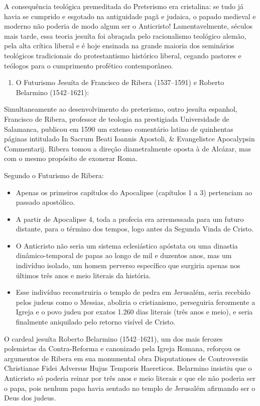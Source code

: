A consequência teológica premeditada do Preterismo era cristalina: se tudo já havia se cumprido e esgotado na antiguidade pagã e judaica, o papado medieval e moderno não poderia de modo algum ser o Anticristo! Lamentavelmente, séculos mais tarde, essa teoria jesuíta foi abraçada pelo racionalismo teológico alemão, pela alta crítica liberal e é hoje ensinada na grande maioria dos seminários teológicos tradicionais do protestantismo histórico liberal, cegando pastores e teólogos para o cumprimento profético contemporâneo.

\begin{enumerate}
  \item O Futurismo Jesuíta de Francisco de Ribera (1537–1591) e Roberto Belarmino (1542–1621):
\end{enumerate}

Simultaneamente ao desenvolvimento do preterismo, outro jesuíta espanhol, Francisco de Ribera, professor de teologia na prestigiada Universidade de Salamanca, publicou em 1590 um extenso comentário latino de quinhentas páginas intitulado In Sacrum Beati Ioannis Apostoli, \& Evangelistce Apocalypsin Commentarij. Ribera tomou a direção diametralmente oposta à de Alcázar, mas com o mesmo propósito de exonerar Roma.

Segundo o Futurismo de Ribera:
\begin{itemize}
  \item Apenas os primeiros capítulos do Apocalipse (capítulos 1 a 3) pertenciam ao passado apostólico.
  \item A partir de Apocalipse 4, toda a profecia era arremessada para um futuro distante, para o término dos tempos, logo antes da Segunda Vinda de Cristo.
  \item O Anticristo não seria um sistema eclesiástico apóstata ou uma dinastia dinâmico-temporal de papas ao longo de mil e duzentos anos, mas um indivíduo isolado, um homem perverso específico que surgiria apenas nos últimos três anos e meio literais da história.
  \item Esse indivíduo reconstruiria o templo de pedra em Jerusalém, seria recebido pelos judeus como o Messias, aboliria o cristianismo, perseguiria ferozmente a Igreja e o povo judeu por exatos 1.260 dias literais (três anos e meio), e seria finalmente aniquilado pelo retorno visível de Cristo.
\end{itemize}


O cardeal jesuíta Roberto Belarmino (1542–1621), um dos mais ferozes polemistas da Contra-Reforma e canonizado pela Igreja Romana, reforçou os argumentos de Ribera em sua monumental obra Disputationes de Controversiis Christianae Fidei Adversus Hujus Temporis Haereticos. Belarmino insistiu que o Anticristo só poderia reinar por três anos e meio literais e que ele não poderia ser o papa, pois nenhum papa havia sentado no templo de Jerusalém afirmando ser o Deus dos judeus.


